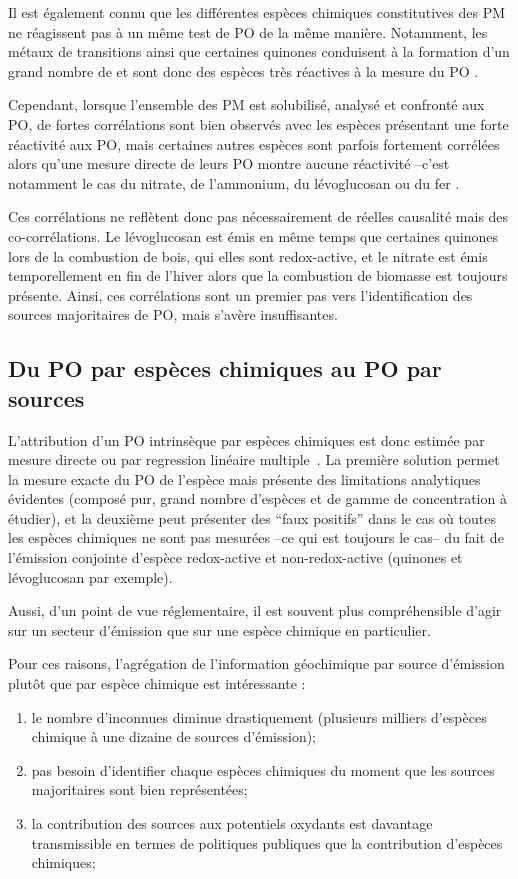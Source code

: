 Il est également connu que les différentes espèces chimiques constitutives des PM ne
réagissent pas à un même test de PO de la même manière. Notamment, les métaux de
transitions ainsi que certaines quinones conduisent à la formation d'un grand nombre de
 et sont donc des espèces très réactives à la mesure du PO
\autocite{charrierRates2015,calasImportance2017}.

Cependant, lorsque l'ensemble des PM est solubilisé, analysé et confronté aux PO, de
fortes corrélations sont bien observés avec les espèces présentant une forte réactivité aux
PO, mais certaines autres espèces sont parfois fortement corrélées alors qu'une mesure
directe de leurs PO montre aucune réactivité --c'est notamment le cas du nitrate,
de l'ammonium, du lévoglucosan ou du fer \autocite{vermaRedox2009,calasComparison2018,calasSeasonal2019}.

Ces corrélations ne reflètent donc pas nécessairement de réelles causalité mais des
co-corrélations. Le lévoglucosan est émis en même temps que certaines quinones lors de la
combustion de bois, qui elles sont redox-active, et le nitrate est émis temporellement en
fin de l'hiver alors que la combustion de biomasse est toujours présente.  Ainsi, ces
corrélations sont un premier pas vers l'identification des sources majoritaires de PO,
mais s'avère insuffisantes.

\subsection{Du PO par espèces chimiques au PO par sources}

L'attribution d'un PO intrinsèque par espèces chimiques est donc estimée par mesure
directe ou par regression linéaire
multiple~\autocite{calasImportance2017,borlazaOxidative2018}. La première solution permet
la mesure exacte du PO de l'espèce mais présente des limitations analytiques évidentes
(composé pur, grand nombre d'espèces et de gamme de concentration à étudier), et la
deuxième peut présenter des ``faux positifs'' dans le cas où toutes les espèces chimiques
ne sont pas mesurées --ce qui est toujours le cas-- du fait de l'émission conjointe
d'espèce redox-active et non-redox-active (quinones et lévoglucosan par exemple).

Aussi, d'un point de vue réglementaire, il est souvent plus compréhensible d'agir sur
un secteur d'émission que sur une espèce chimique en particulier.

Pour ces raisons, l'agrégation de l'information géochimique par source d'émission plutôt
que par espèce chimique est intéressante :
\begin{enumerate}
    \item le nombre d'inconnues diminue drastiquement (plusieurs milliers d'espèces
        chimique à une dizaine de sources d'émission);
    \item pas besoin d'identifier chaque espèces chimiques du moment que les sources
        majoritaires sont bien représentées;
    \item la contribution des sources aux potentiels oxydants est davantage transmissible
        en termes de politiques publiques que la contribution d'espèces chimiques;
\end{enumerate}

